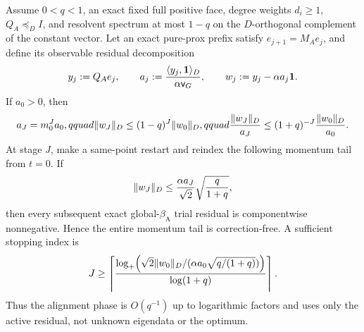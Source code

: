 \begin{proposition}
\label{prop:aesp-cd-observable-alignment-tail}
Assume $0<q<1$, an exact fixed full positive face, degree weights $d_i\geq1$,
$Q_A\preceq_D I$, and resolvent spectrum at most $1-q$ on the
$D$-orthogonal complement of the constant vector.  Let an exact pure-prox prefix satisfy
$e_{j+1}=M_Ae_j$, and define its observable residual decomposition
\begin{equation*}
 y_j:=Q_Ae_j,\qquad
 a_j:=\frac{\langle y_j,\mathbf{1}\rangle_D}{\alpha\mathsf v_G},\qquad
 w_j:=y_j-\alpha a_j\mathbf{1}.
\end{equation*}
If $a_0>0$, then
\begin{equation}
 a_J=m_0^Ja_0,qquad
 \lVert w_J\rVert_D\leq(1-q)^J\lVert w_0\rVert_D,qquad
 \frac{\lVert w_J\rVert_D}{a_J}
 \leq(1+q)^{-J}\frac{\lVert w_0\rVert_D}{a_0}.
 \label{eq:aesp-cd-observable-alignment-rate}
\end{equation}
At stage $J$, make a same-point restart and reindex the following momentum
tail from $t=0$.  If
\begin{equation}
 \lVert w_J\rVert_D
 \leq\frac{\alpha a_J}{\sqrt2}
       \sqrt{\frac q{1+q}},
 \label{eq:aesp-cd-observable-alignment-gate}
\end{equation}
then every subsequent exact global-$\beta_{\mathrm A}$ trial residual is
componentwise nonnegative.  Hence the entire momentum tail is
correction-free.  A sufficient stopping index is
\begin{equation}
 J\geq
 \left\lceil
 \frac{\log_+\!\left(
  \sqrt2\lVert w_0\rVert_D/(\alpha a_0\sqrt{q/(1+q)})
 \right)}{\log(1+q)}
 \right\rceil.
 \label{eq:aesp-cd-observable-alignment-work}
\end{equation}
Thus the alignment phase is $O(q^{-1})$ up to logarithmic factors and uses
only the active residual, not unknown eigendata or the optimum.
\end{proposition}

